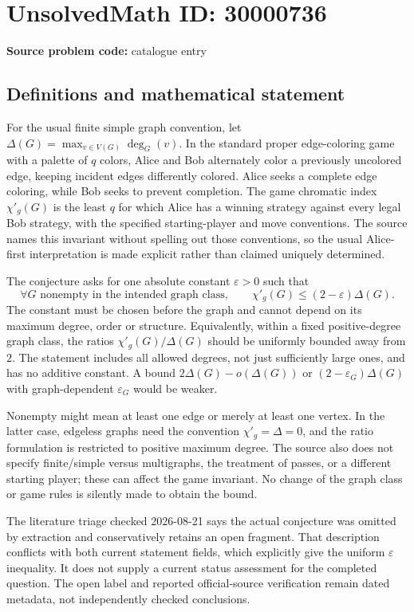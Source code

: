 \documentclass[11pt]{article}
\begin{document}
\section*{UnsolvedMath ID: 30000736}
\textbf{Source problem code:} catalogue entry
\subsection{Definitions and mathematical statement}
For the usual finite simple graph convention, let \(\Delta(G)=\max_{v\in V(G)}\deg_G(v)\). In the standard proper edge-coloring game with a palette of \(q\) colors, Alice and Bob alternately color a previously uncolored edge, keeping incident edges differently colored. Alice seeks a complete edge coloring, while Bob seeks to prevent completion. The game chromatic index \(\chi'_g(G)\) is the least \(q\) for which Alice has a winning strategy against every legal Bob strategy, with the specified starting-player and move conventions. The source names this invariant without spelling out those conventions, so the usual Alice-first interpretation is made explicit rather than claimed uniquely determined.

The conjecture asks for one absolute constant \(\varepsilon>0\) such that
\[
 \forall G\text{ nonempty in the intended graph class},\qquad
 \chi'_g(G)\leq(2-\varepsilon)\Delta(G).
\]
The constant must be chosen before the graph and cannot depend on its maximum degree, order or structure. Equivalently, within a fixed positive-degree graph class, the ratios \(\chi'_g(G)/\Delta(G)\) should be uniformly bounded away from \(2\). The statement includes all allowed degrees, not just sufficiently large ones, and has no additive constant. A bound \(2\Delta(G)-o(\Delta(G))\) or \((2-\varepsilon_G)\Delta(G)\) with graph-dependent \(\varepsilon_G\) would be weaker.

Nonempty might mean at least one edge or merely at least one vertex. In the latter case, edgeless graphs need the convention \(\chi'_g=\Delta=0\), and the ratio formulation is restricted to positive maximum degree. The source also does not specify finite/simple versus multigraphs, the treatment of passes, or a different starting player; these can affect the game invariant. No change of the graph class or game rules is silently made to obtain the bound.

The literature triage checked 2026-08-21 says the actual conjecture was omitted by extraction and conservatively retains an open fragment. That description conflicts with both current statement fields, which explicitly give the uniform \(\varepsilon\) inequality. It does not supply a current status assessment for the completed question. The open label and reported official-source verification remain dated metadata, not independently checked conclusions.
\end{document}
